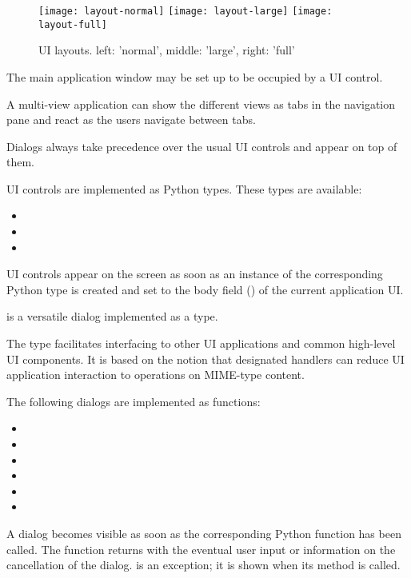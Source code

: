\begin{figure}
\centering
\texttt{[image: layout-normal]}
\texttt{[image: layout-large]}
\texttt{[image: layout-full]}
\caption{UI layouts. left: 'normal', middle: 'large', right: 'full'}
\label{fig:alternate-uilayouts}
\end{figure}

The main application window may be set up to be occupied by a UI control.

A multi-view application can show the different views as tabs in the 
navigation pane and react as the users navigate between tabs. 

Dialogs always take precedence over the usual UI controls and appear on top 
of them.

UI controls are implemented as Python types. These types are available:

\begin{itemize}
\item {}
\item {}
\item {}
\end{itemize}
UI controls appear on the screen as soon as an instance of the corresponding 
Python type is created and set to the body field () of the 
current application UI.

 is a versatile dialog implemented as a type.

The  type facilitates interfacing to other UI
applications and common high-level UI components. It is based on the
notion that designated handlers can reduce UI application interaction
to operations on MIME-type content.

The following dialogs are implemented as functions:

\begin{itemize}
\item {}
\item {}
\item {}
\item {}
\item {}
\item {}
\end{itemize}
A dialog becomes visible as soon as the corresponding Python function has 
been called. The function returns with the eventual user input or 
information on the cancellation of the dialog.  is an 
exception; it is shown when its  method is called.

